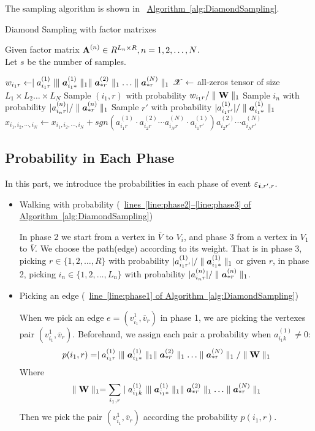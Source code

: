 \documentclass{article}
\newcommand{\Sca}[3]{{#1}^{(#2)}_{i_#2#3}}%
\newcommand{\T}[1]{\boldsymbol{\mathscr{\MakeUppercase{#1}}}}
\newcommand{\V}[1]{{\bm{{\MakeLowercase{#1}}}}}
\newcommand{\Varow}[1]{\V{a}^{(#1)}_{i_#1*}}
\newcommand{\Vacol}[1]{\V{a}^{(#1)}_{*r}}
\newcommand{\M}[1]{{\bm{\mathbf{\MakeUppercase{#1}}}}}
\newcommand{\norm}[2]{\parallel#1\parallel_{#2}}
\newcommand{\Alg}[1] {\hyperref[alg:#1] {Algorithm~\ref*{alg:#1}}}
\newcommand{\AlgLine}[2]{\hyperref[alg:#1]{line~\ref*{line:#2} of Algorithm~\ref*{alg:#1}}}
\newcommand{\AlgLines}[3]{\hyperref[alg:#1]{lines~\ref*{line:#2}--\ref*{line:#3} of Algorithm~\ref*{alg:#1}}}
\begin{document}
The sampling algorithm is shown in ~\Alg{DiamondSampling}.

\begin{algorithm}[ht]
    \caption{Diamond Sampling with factor matrixes}
    \label{alg:DiamondSampling}
    Given factor matrix $\M{A}^{(n)}\in R^{L_n\times R}, n = 1,2,\ldots,N$.\\
    Let $s$ be the number of samples.
    \begin{algorithmic}[1]
    \For{all $\Sca{a}{1}{r} \neq 0$}
    \State $w_{i_1r} \leftarrow \mid \Sca{a}{1}{r}\mid
    \norm{\Varow{1}}{1}\norm{\Vacol{2}}{1}\ldots\norm{\Vacol{N}}{1} $
    \EndFor
    \State $\T{X} \leftarrow$ all-zeros tensor of size
    $L_1\times L_2\ldots\times L_N$
    \State Sample $(i_1,r)$ with probability $w_{i_1r}/\norm{\M{W}}{1}$        \label{line:phase1}
    \State Sample $i_n$ with probability $|\Sca{a}{n}{r}|/\norm{\Vacol{n}}{1}$
    \label{line:phase2}
    \EndFor
    \State Sample $r'$ with probability $|\Sca{a}{1}{r'}|/\norm{\Varow{1}}{1}$
    \label{line:phase3}
    \State $x_{i_1,i_2,\cdots,i_N}\leftarrow x_{i_1,i_2,\cdots,i_N} +
    sgn(\Sca{a}{1}{r}\cdot\Sca{a}{2}{r}\cdots\Sca{a}{N}{r}\cdot\Sca{a}{1}{r'})
    \Sca{a}{2}{r'}\cdots\Sca{a}{N}{r'}$
    \label{line:scoring}
    \EndFor
    \end{algorithmic}
\end{algorithm}

\subsection{Probability in Each Phase}

In this part, we introduce the probabilities in each phase of event $\varepsilon_{\V{i},r',r}$.

\begin{itemize}
  \item Walking with probability  (~\AlgLines{DiamondSampling}{phase2}{phase3})

  In phase 2 we start from a vertex in $\overline{V}$ to $V_i$, and phase 3 from a vertex in $V_1$ to $\overline{V}$. We choose the path(edge) according to its weight. That is in phase 3, picking $r\in\{1,2,\ldots,R\}$ with probability $|\Sca{a}{1}{r'}|/\norm{\Varow{1}}{1}$ or given $r$, in phase 2, picking $i_n\in\{1,2,\ldots,L_n\}$ with probability $|\Sca{a}{n}{r}|/\norm{\Vacol{n}}{1}$.

  \item Picking an edge (~\AlgLine{DiamondSampling}{phase1})

  When we pick an edge $e=(v^1_{i_1},\overline{v}_r)$ in phase 1, we are picking the vertexes pair $(v^1_{i_1},\overline{v}_r)$. Beforehand, we assign each pair a probability when $ \Sca{a}{1}{k} \neq 0 $:
  \[
    p(i_1,r) = \mid\Sca{a}{1}{r}\mid \norm{\Varow{1}}{1} \norm{\Vacol{2}}{1} \ldots \norm{\Vacol{N}}{1} / \norm{\M{W}}{1}
  \]
  Where
  \[
    \norm{\M{W}}{1} = \sum_{i_1,r}\mid \Sca{a}{1}{k}\mid \norm{\Varow{1}}{1} \norm{\Vacol{2}}{1} \ldots \norm{\Vacol{N}}{1}
  \]
  Then we pick the pair $(v^1_{i_1},\overline{v}_r)$ according the probability $p(i_1,r)$.
\end{itemize}
\end{document}
